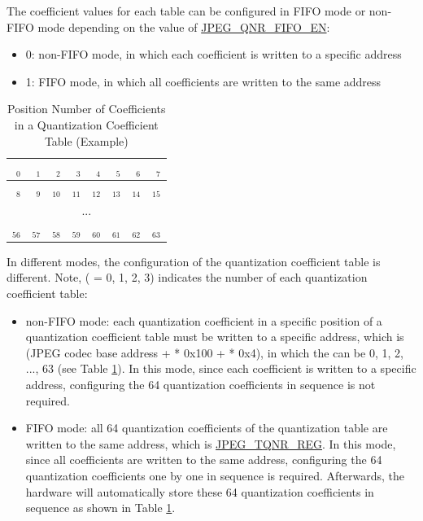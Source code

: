 \documentclass[main\_\_EN.tex]{subfiles}
\begin{document}
The coefficient values for each table can be configured in FIFO mode or non-FIFO mode depending on the value of \hyperref[fielddesc:JPEGQNRFIFOEN]{JPEG\_QNR\_FIFO\_EN}:
\begin{itemize}
    \item 0: non-FIFO mode, in which each coefficient is written to a specific address
    \item 1: FIFO mode, in which all coefficients are written to the same address
\end{itemize}

\begin{longtable}{ | r | r | r | r | r | r | r | r | }
\caption{Position Number of Coefficients in a Quantization Coefficient Table (Example)} \label{tab:example_qnr}
\\ \hline
 $_{0}$ & $_{1}$ & $_{2}$ & $_{3}$ & $_{4}$ & $_{5}$ & $_{6}$ & $_{7}$ \\ \hline
 $_{8}$ & $_{9}$ & $_{10}$ & $_{11}$ & $_{12}$ & $_{13}$ & $_{14}$ & $_{15}$ \\ \hline
 \multicolumn{8}{c}{...} \\ \hline
 $_{56}$ & $_{57}$ & $_{58}$ & $_{59}$ & $_{60}$ & $_{61}$ & $_{62}$ & $_{63}$ \\ \hline
\end{longtable}

In different modes, the configuration of the quantization coefficient table is different. Note,  ( = 0, 1, 2, 3) indicates the number of each quantization coefficient table:
\begin{itemize}
    \item non-FIFO mode: each quantization coefficient in a specific position of a quantization coefficient table  must be written to a specific address, which is (JPEG codec base address +  * 0x100 +  * 0x4), in which the  can be 0, 1, 2, ..., 63 (see Table \ref{tab:example_qnr}). In this mode, since each coefficient is written to a specific address, configuring the 64 quantization coefficients in sequence is not required.
    \item FIFO mode: all 64 quantization coefficients of the quantization table  are written to the same address, which is \hyperref[regdesc:JPEGT0QNRREG]{JPEG\_TQNR\_REG}. In this mode, since all coefficients are written to the same address, configuring the 64 quantization coefficients one by one in sequence is required. Afterwards, the hardware will automatically store these 64 quantization coefficients in sequence as shown in Table \ref{tab:example_qnr}.
\end{itemize}
\end{document}
